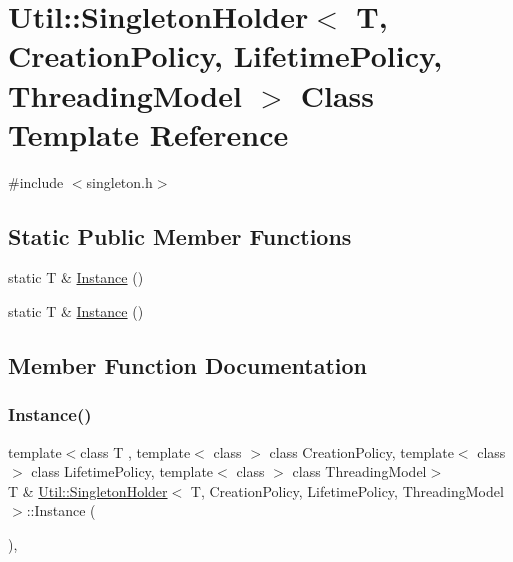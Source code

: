 \hypertarget{classUtil_1_1SingletonHolder}{}\section{Util\+:\+:Singleton\+Holder$<$ T, Creation\+Policy, Lifetime\+Policy, Threading\+Model $>$ Class Template Reference}
\label{classUtil_1_1SingletonHolder}


{\ttfamily \#include $<$singleton.\+h$>$}

\subsection*{Static Public Member Functions}
\begin{DoxyCompactItemize}
\item 
static T \& \mbox{\hyperlink{classUtil_1_1SingletonHolder_aaebc14e9f950be2eb5f30207db23e2f5}{Instance}} ()
\item 
static T \& \mbox{\hyperlink{classUtil_1_1SingletonHolder_ab7cd7d81731ce5e022f12724dad02230}{Instance}} ()
\end{DoxyCompactItemize}


\subsection{Member Function Documentation}
\mbox{\label{classUtil_1_1SingletonHolder_aaebc14e9f950be2eb5f30207db23e2f5}} 
\subsubsection{\texorpdfstring{Instance()}{Instance()}\hspace{0.1cm}{\footnotesize\ttfamily [1/2]}}
{\footnotesize\ttfamily template$<$class T , template$<$ class $>$ class Creation\+Policy, template$<$ class $>$ class Lifetime\+Policy, template$<$ class $>$ class Threading\+Model$>$ \\
T \& \mbox{\hyperlink{classUtil_1_1SingletonHolder}{Util\+::\+Singleton\+Holder}}$<$ T, Creation\+Policy, Lifetime\+Policy, Threading\+Model $>$\+::Instance (\begin{DoxyParamCaption}{ }\end{DoxyParamCaption})\hspace{0.3cm}{\ttfamily [inline]}, {\ttfamily [static]}}

